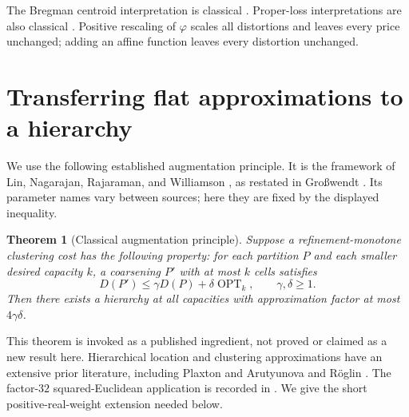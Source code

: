 \documentclass[11pt]{article}
\newtheorem{theorem}{Theorem}[section]
\theoremstyle{definition}\newtheorem{definition}[theorem]{Definition}
\theoremstyle{remark}\newtheorem{remark}[theorem]{Remark}
\newcommand{\ph}{\varphi}
\newcommand{\OPT}{\operatorname{OPT}}
\begin{document}
The Bregman centroid interpretation is classical \cite{banerjee}. Proper-loss interpretations are also classical \cite{gneiting,reid}. Positive rescaling of $\ph$ scales all distortions and leaves every price unchanged; adding an affine function leaves every distortion unchanged.

\section{Transferring flat approximations to a hierarchy}
\label{sec:transfer}
We use the following established augmentation principle. It is the framework of Lin, Nagarajan, Rajaraman, and Williamson \cite{lin}, as restated in Gro\ss wendt \cite[Theorem 2.11, p.~29]{grosswendt}. Its parameter names vary between sources; here they are fixed by the displayed inequality.

\begin{theorem}[Classical augmentation principle]
\label{thm:augmentation}
Suppose a refinement-monotone clustering cost has the following property: for each partition $P$ and each smaller desired capacity $k$, a coarsening $P'$ with at most $k$ cells satisfies
\begin{equation}
D(P')\le\gamma D(P)+\delta\OPT_k,\qquad \gamma,\delta\ge1.
\label{eq:augment}
\end{equation}
Then there exists a hierarchy at all capacities with approximation factor at most $4\gamma\delta$.
\end{theorem}
This theorem is invoked as a published ingredient, not proved or claimed as a new result here. Hierarchical location and clustering approximations have an extensive prior literature, including Plaxton \cite{plaxton} and Arutyunova and R\"oglin \cite{arutyunova}. The factor-$32$ squared-Euclidean application is recorded in \cite[Lemma 2.13, pp.~30--31; Theorem 1.2, p.~32]{grosswendt}. We give the short positive-real-weight extension needed below.
\end{document}
